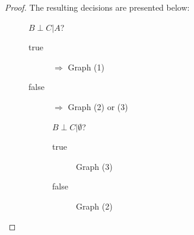 \documentclass{amsart}
\theoremstyle{plain}
\renewcommand{\implies}{\Rightarrow}
\begin{document}
\begin{proof}
  The resulting decisions are presented below:

  \begin{description}
    \item[] $B\perp C|A$?
      \begin{description}
        \item[true] $\implies$ Graph (1)
        \item[false] $\implies$ Graph (2) or (3)
        \item[] $B\perp C|\emptyset$?
          \begin{description}
            \item[true] Graph (3)
            \item[false] Graph (2)
          \end{description}
      \end{description}
  \end{description}
\end{proof}
\end{document}
